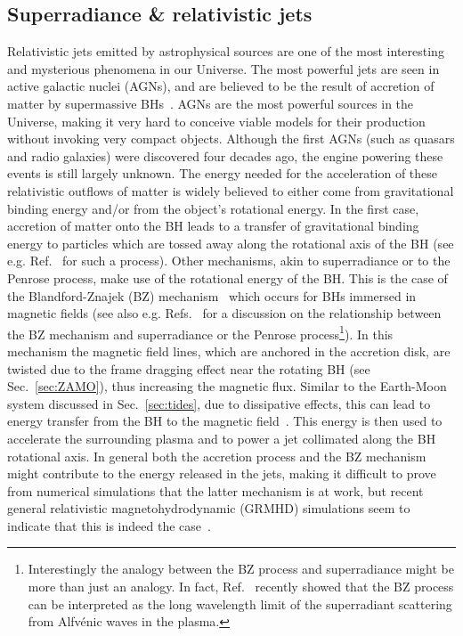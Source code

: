 \documentclass[11pt]{article}
\numberwithin{equation}{section} %
\begin{document}
\subsection{Superradiance \& relativistic jets } \label{sec:BZ}
Relativistic jets emitted by astrophysical sources are one of the most interesting and mysterious phenomena in our 
Universe. The most powerful jets are seen in active galactic nuclei (AGNs), and are believed to be the result of 
accretion of matter by supermassive BHs~\cite{LyndenBell:1969yx}. AGNs are the most powerful sources in the Universe, 
making it very hard to conceive viable models for their production without invoking very compact objects. Although the 
first AGNs (such as quasars and radio galaxies) were discovered four decades ago, the engine powering these events is 
still largely unknown. The energy needed for the acceleration of these relativistic outflows of matter is widely 
believed to either come from gravitational binding energy and/or from the object's rotational energy. In the first case, 
accretion of matter onto the BH leads to a transfer of gravitational binding energy to particles which are tossed away 
along the rotational axis of the BH (see e.g. Ref.~\cite{Blandford:1982di} for such a process). Other mechanisms, akin 
to superradiance or to the Penrose process, make use of the rotational energy of the BH. This is the case of the 
Blandford-Znajek (BZ) mechanism~\cite{Blandford:1977ds} which occurs for BHs immersed in magnetic fields (see also e.g. 
Refs.~\cite{Komissarov:2008yh,Lasota:2013kia,Kinoshita:2017mio} for a discussion on the relationship between the BZ mechanism and 
superradiance or the Penrose process\footnote{Interestingly the analogy between the BZ process and superradiance might be more than just an analogy. In fact, Ref.~\cite{Noda:2019mzd} recently showed that the BZ process can be interpreted as the long wavelength limit of the superradiant scattering from Alfv\'{e}nic waves in the plasma.}). In this mechanism the magnetic field lines, which are anchored in the accretion 
disk, are twisted due to the frame dragging effect near the rotating BH (see Sec.~\ref{sec:ZAMO}), thus increasing the 
magnetic flux.
Similar to the Earth-Moon system discussed in Sec.~\ref{sec:tides}, due to dissipative effects, this can lead to energy 
transfer from the BH to the magnetic field~\cite{MacDonald:1982zz}. This energy is then used to accelerate the 
surrounding plasma and to power a jet collimated along the BH rotational axis. In general both the accretion process and 
the BZ mechanism might contribute to the energy released in the jets, making it difficult to prove from numerical 
simulations that the latter mechanism is at work, but recent general relativistic magnetohydrodynamic (GRMHD) 
simulations seem to indicate that this is indeed the 
case~\cite{Tchekhovskoy:2012up,McKinney:2012vh,Penna:2013rga,Lasota:2013kia}.
\end{document}
